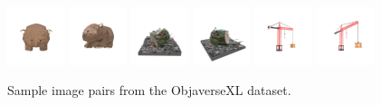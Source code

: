\begin{figure}[htbp]
  \includegraphics[width=0.15\textwidth]{images/data/samples/22.1.jpeg}\hspace{0.01\textwidth}%
  \includegraphics[width=0.15\textwidth]{images/data/samples/22.2.jpeg}\hfill
  \includegraphics[width=0.15\textwidth]{images/data/samples/23.1.jpeg}\hspace{0.01\textwidth}%
  \includegraphics[width=0.15\textwidth]{images/data/samples/23.2.jpeg}\hfill
  \includegraphics[width=0.15\textwidth]{images/data/samples/24.1.jpeg}\hspace{0.01\textwidth}%
  \includegraphics[width=0.15\textwidth]{images/data/samples/24.2.jpeg}

  \caption{Sample image pairs from the ObjaverseXL dataset.}
  \label{fig:dataset-sample-pairs-1}
\end{figure}

